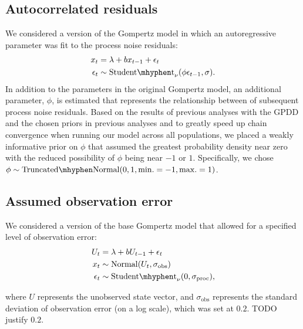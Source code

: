 \documentclass[12pt]{article}
\begin{document}
\subsection{Autocorrelated residuals}

We considered a version of the Gompertz model in which an autoregressive parameter was fit to the process noise residuals:
\begin{align*}
x_t &= \lambda + b x_{t-1} + \epsilon_t\\
\epsilon_t &\sim \mathrm{Student\mhyphen t}_\nu(\phi \epsilon_{t-1}, \sigma).
\end{align*}
\noindent
In addition to the parameters in the original Gompertz model, an additional parameter, $\phi$, is estimated that represents the relationship between of subsequent process noise residuals. Based on the results of previous analyses with the GPDD \citep[e.g.][]{connors2014} and the chosen priors in previous analyses \citep[e.g.][]{thorson2014a} and to greatly speed up chain convergence when running our model across all populations, we placed a weakly informative prior on $\phi$ that assumed the greatest probability density near zero with the reduced possibility of $\phi$ being near $-1$ or $1$. Specifically, we chose $\phi \sim \mathrm{Truncated\mhyphen Normal}(0, 1, \mathrm{min.} = -1, \mathrm{max.} = 1)$.

\subsection{Assumed observation error}

We considered a version of the base Gompertz model that allowed for a specified level of observation error:
\begin{align*}
U_t &= \lambda + b U_{t-1} + \epsilon_t\\
x_t &\sim \mathrm{Normal}(U_t, \sigma_\mathrm{obs})\\
\epsilon_t &\sim \mathrm{Student\mhyphen t}_\nu(0, \sigma_\mathrm{proc}),
\end{align*}

\noindent
where $U$ represents the unobserved state vector, and $\sigma_\mathrm{obs}$ represents the standard deviation of observation error (on a log scale), which was set at $0.2$. TODO justify $0.2$.


\renewcommand{\thetable}{S\arabic{table}}
\setcounter{table}{0}


\end{document}
